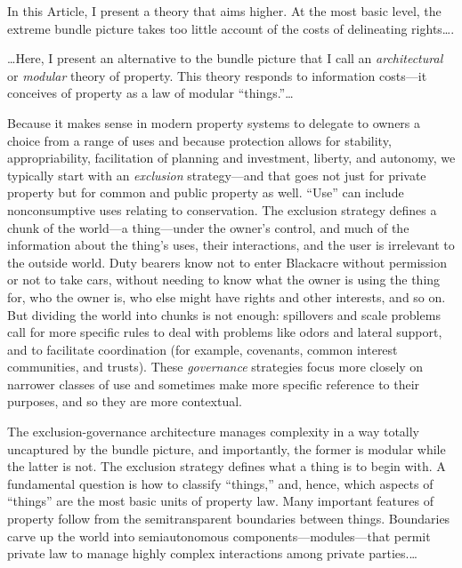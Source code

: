 In this Article, I present a theory that aims higher. At the most basic level,
the extreme bundle picture takes too little account of the costs of delineating
rights\ldots .

\ldots Here, I present an alternative to the bundle picture that I call an
\textit{architectural} or \textit{modular} theory of property. This theory
responds to information costs---it conceives of property as a law of modular
``things.''\ldots

Because it makes sense in modern property systems to delegate to owners a choice
from a range of uses and because protection allows for stability,
appropriability, facilitation of planning and investment, liberty, and
autonomy, we typically start with an \textit{exclusion} strategy---and that
goes not just for private property but for common and public property as well.
``Use'' can include nonconsumptive uses relating to conservation. The exclusion
strategy defines a chunk of the world---a thing---under the owner's control,
and much of the information about the thing's uses, their interactions, and the
user is irrelevant to the outside world. Duty bearers know not to enter
Blackacre without permission or not to take cars, without needing to know what
the owner is using the thing for, who the owner is, who else might have rights
and other interests, and so on. But dividing the world into chunks is not
enough: spillovers and scale problems call for more specific rules to deal with
problems like odors and lateral support, and to facilitate coordination (for
example, covenants, common interest communities, and trusts). These
\textit{governance} strategies focus more closely on narrower classes of use
and sometimes make more specific reference to their purposes, and so they are
more contextual. 

The exclusion-governance architecture manages complexity in a way totally
uncaptured by the bundle picture, and importantly, the former is modular while
the latter is not. The exclusion strategy defines what a thing is to begin
with. A fundamental question is how to classify ``things,'' and, hence, which
aspects of ``things'' are the most basic units of property law. Many important
features of property follow from the semitransparent boundaries between things.
Boundaries carve up the world into semiautonomous components---modules---that
permit private law to manage highly complex interactions among private
parties.\ldots

